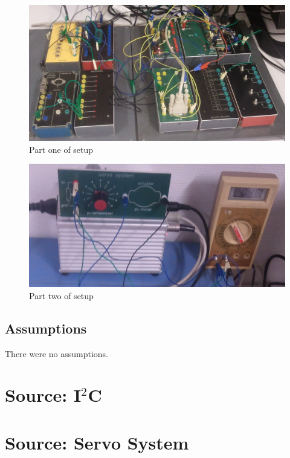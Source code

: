 \documentclass[a4paper, 12pt, titlepage]{article}
\begin{document}
\addtolength{\oddsidemargin}{+1in}
\addtolength{\evensidemargin}{+1in}
\newpage
\begin{figure}[H]
\caption{Part one of setup}
\includegraphics[scale=0.20]{servo_01.jpg}
\end{figure}
\begin{figure}[H]
\caption{Part two of setup}
\includegraphics[scale=0.20]{servo_02.jpg}
\end{figure}

\subsection{Assumptions} %
There were no assumptions.


\newpage
\appendix
\addtolength{\oddsidemargin}{-1in}
\addtolength{\evensidemargin}{-1in}
\section{Source: I$^2$C} %

\lstset{language=C}


\newpage
\section{Source: Servo System} %
\lstset{language=C}

\end{document}
